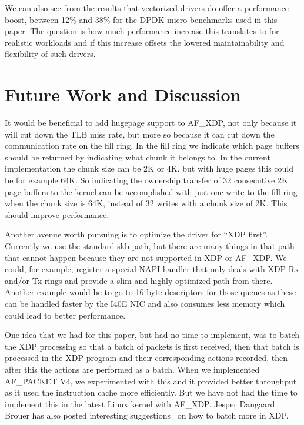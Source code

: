 \documentclass[9pt,numbers,reprint]{sigplanconf}
\begin{document}
We can also see from the results that vectorized drivers do offer a
performance boost, between 12\% and 38\% for the DPDK micro-benchmarks
used in this paper. The question is how much performance increase this
translates to for realistic workloads and if this increase offsets the
lowered maintainability and flexibility of such drivers.


\section{Future Work and Discussion}
\label{sec:future}

It would be beneficial to add hugepage support to AF\_XDP, not only
because it will cut down the TLB miss rate, but more so because it can
cut down the communication rate on the fill ring. In the fill ring we
indicate which page buffers should be returned by indicating what
chunk it belongs to. In the current implementation the chunk size can
be 2K or 4K, but with huge pages this could be for example 64K. So
indicating the ownership transfer of 32 consecutive 2K page buffers to
the kernel can be accomplished with just one write to the fill ring
when the chunk size is 64K, instead of 32 writes with a chunk size of
2K. This should improve performance.

Another avenue worth pursuing is to optimize the driver for ``XDP
first''. Currently we use the standard skb path, but there are many
things in that path that cannot happen because they are not supported
in XDP or AF\_XDP. We could, for example, register a special NAPI
handler that only deals with XDP Rx and/or Tx rings and provide a slim
and highly optimized path from there. Another example would be to go
to 16-byte descriptors for those queues as these can be handled faster
by the I40E NIC and also consumes less memory which could lead to
better performance.

One idea that we had for this paper, but had no time to implement, was
to batch the XDP processing so that a batch of packets is first
received, then that batch is processed in the XDP program and their
corresponding actions recorded, then after this the actions are
performed as a batch. When we implemented AF\_PACKET V4, we
experimented with this and it provided better throughput as it used
the instruction cache more efficiently. But we have not had the time
to implement this in the latest Linux kernel with AF\_XDP. Jesper
Dangaard Brouer has also posted interesting
suggestions~\cite{jesper_batching} on how to batch more in XDP.
\end{document}
